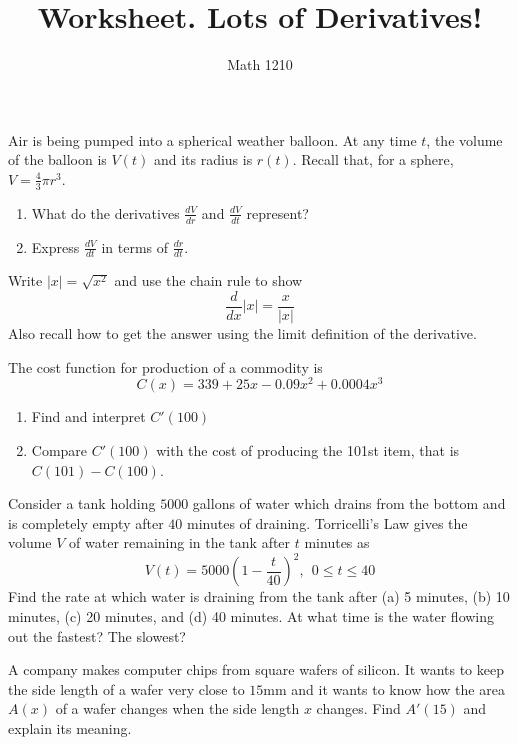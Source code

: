 \documentclass[12pt, a4paper]{article}
\author{Math 1210}
\title{Worksheet. Lots of Derivatives!}
\date{}
\begin{document}
\maketitle
\nameline
\begin{ex}
  Air is being pumped into a spherical weather balloon. At any time
  \(t\), the volume of the balloon is \(V(t)\) and its radius is
  \(r(t)\). Recall that, for a sphere, \(V = \frac{4}{3} \pi r^3\).
  \begin{enumerate}
  \item What do the derivatives \(\frac{dV}{dr}\) and
    \(\frac{dV}{dt}\) represent?
  \item Express \(\frac{dV}{dt}\) in terms of \(\frac{dr}{dt}\).
  \end{enumerate}
\end{ex}
\begin{ex}
  Write \(|x| = \sqrt{x^2}\) and use the chain rule to show \[
    \frac{d}{dx}|x| = \frac{x}{|x|}
  \]
  Also recall how to get the answer using the limit definition of the
  derivative.
\end{ex}
\begin{ex}
  The cost function for production of a commodity is \[
    C(x) = 339 + 25x - 0.09x^2 + 0.0004 x^3
  \]
  \begin{enumerate}
  \item Find and interpret \(C'(100)\)
  \item Compare \(C'(100)\) with the cost of producing the 101st item,
    that is \(C(101) - C(100)\).
  \end{enumerate}
\end{ex}
\begin{ex}
  Consider a tank holding \(5000\) gallons of water which drains from
  the bottom and is completely empty after \(40\) minutes of
  draining. Torricelli's Law gives the volume \(V\) of water remaining
  in the tank after \(t\) minutes as \[
    V(t) = 5000\left( 1 - \frac{t}{40} \right)^2, \ \ 0 \leq t \leq 40
  \]
  Find the rate at which water is draining from the tank after (a) 5
  minutes, (b) 10 minutes, (c) 20 minutes, and (d) 40 minutes. At what
  time is the water flowing out the fastest? The slowest?
\end{ex}
\begin{ex}
  A company makes computer chips from square wafers of silicon. It
  wants to keep the side length of a wafer very close to \(15\)mm and
  it wants to know how the area \(A(x)\) of a wafer changes when the
  side length \(x\) changes. Find \(A'(15)\) and explain its meaning.
\end{ex}
\end{document}
